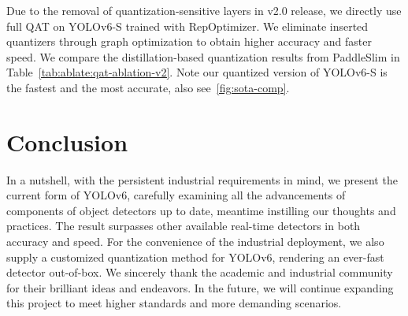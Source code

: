 \documentclass[10pt,twocolumn,letterpaper]{article}
\begin{document}
 
Due to the removal of quantization-sensitive layers in v2.0 release, we directly use full QAT on YOLOv6-S trained with RepOptimizer. We eliminate inserted quantizers through graph optimization to obtain higher accuracy and faster speed. We compare the distillation-based quantization results from PaddleSlim\cite{baidu2022paddleslim}  in Table~\ref{tab:ablate:qat-ablation-v2}. Note our quantized version of YOLOv6-S is the fastest and the most accurate, also see~\cref{fig:sota-comp}.
 
 \begin{table}[ht]
    \begin{center}
    \end{center}
    \caption{QAT performance of YOLOv6-S (v2.0) compared with other quantized detectors. `$^*$': based on v1.0 release. `$^\dagger$': We tested with TensorRT 8 on Tesla T4 with a batch size of 1 and 32.}
    \label{tab:ablate:qat-ablation-v2}
  \end{table}
  
 
             

\section{Conclusion}
In a nutshell, with the persistent industrial requirements in mind, we present the current form of YOLOv6, carefully examining all the advancements of components of object detectors up to date, meantime instilling our thoughts and practices. The result surpasses other available real-time detectors in both accuracy and speed. For the convenience of the industrial deployment, we also supply a customized quantization method for YOLOv6, rendering an ever-fast detector out-of-box. We sincerely thank the academic and industrial community for their brilliant ideas and endeavors. In the future, we will continue expanding this project to meet higher standards and more demanding scenarios. 
{\small


}
\end{document}
